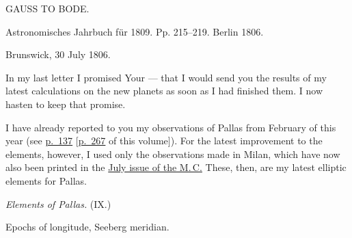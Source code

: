 \clearpage
{}
\hypertarget{native-283-lower}{}
\begin{center}
GAUSS TO BODE.
\end{center}

\begin{center}
Astronomisches Jahrbuch für 1809. Pp. 215–219. Berlin 1806.
\end{center}

\begin{flushright}
Brunswick, 30 July 1806.
\end{flushright}

\par\indent In my last letter I promised Your --- that I would send you the results of my latest calculations on the new planets as soon as I had finished them. I now hasten to keep that promise.

\par\indent I have already reported to you my observations of Pallas from February of this year (see \href{https://www.digitale-sammlungen.de/en/view/bsb10538338?page=147}{p.~137} [\hyperlink{native-272}{p.~267} of this volume]). For the latest improvement to the elements, however, I used only the observations made in Milan, which have now also been printed in the \href{https://www.digitale-sammlungen.de/en/view/bsb10538606?page=100}{July issue of the M.\,C.} These, then, are my latest elliptic elements for Pallas.

\begin{center}
\emph{Elements of Pallas.} (IX.)

Epochs of longitude, Seeberg meridian.
\end{center}


